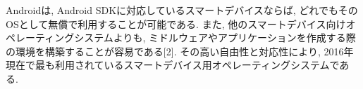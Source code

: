 Androidは, Android SDKに対応しているスマートデバイスならば, どれでもそのOSとして無償で利用することが可能である.
また, 他のスマートデバイス向けオペレーティングシステムよりも, ミドルウェアやアプリケーションを作成する際の環境を構築することが容易である[2].
その高い自由性と対応性により, 2016年現在で最も利用されているスマートデバイス用オペレーティングシステムである.

